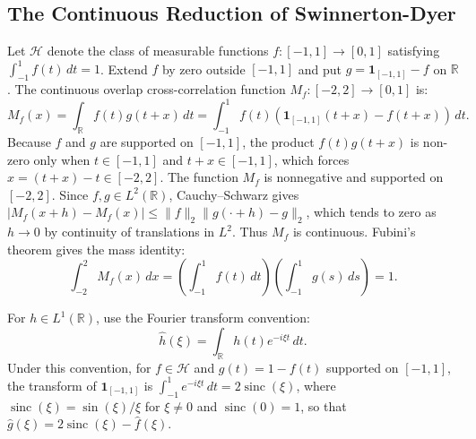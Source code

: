 \documentclass[11pt,a4paper]{article}
\theoremstyle{definition}
\theoremstyle{remark}
\newcommand{\R}{\mathbb{R}}
\begin{document}
\subsection{The Continuous Reduction of Swinnerton-Dyer}

Let $\mathcal{H}$ denote the class of measurable functions $f: [-1, 1] \to [0, 1]$ satisfying $\int_{-1}^1 f(t) \, dt = 1$. Extend $f$ by zero outside $[-1,1]$ and put $g = \mathbf{1}_{[-1,1]} - f$ on $\R$. The continuous overlap cross-correlation function $M_f: [-2, 2] \to [0, 1]$ is:
\begin{equation}
M_f(x) = \int_{\R} f(t) g(t+x) \, dt = \int_{-1}^1 f(t) \left(\mathbf{1}_{[-1, 1]}(t+x) - f(t+x)\right) \, dt.
\end{equation}
Because $f$ and $g$ are supported on $[-1, 1]$, the product $f(t)g(t+x)$ is non-zero only when $t \in [-1, 1]$ and $t+x \in [-1, 1]$, which forces $x = (t+x) - t \in [-2, 2]$. The function $M_f$ is nonnegative and supported on $[-2,2]$. Since $f,g \in L^2(\R)$, Cauchy--Schwarz gives $|M_f(x+h)-M_f(x)| \le \|f\|_2\|g(\cdot+h)-g\|_2$, which tends to zero as $h \to 0$ by continuity of translations in $L^2$. Thus $M_f$ is continuous. Fubini's theorem gives the mass identity:
\begin{equation}
\int_{-2}^2 M_f(x) \, dx = \left( \int_{-1}^1 f(t) \, dt \right) \left( \int_{-1}^1 g(s) \, ds \right) = 1.
\end{equation}

For $h \in L^1(\R)$, use the Fourier transform convention:
\begin{equation}
\widehat{h}(\xi) = \int_{\R} h(t) e^{-i\xi t} \, dt.
\end{equation}
Under this convention, for $f \in \mathcal{H}$ and $g(t) = 1 - f(t)$ supported on $[-1, 1]$, the transform of $\mathbf{1}_{[-1, 1]}$ is $\int_{-1}^1 e^{-i\xi t} \, dt = 2 \operatorname{sinc}(\xi)$, where $\operatorname{sinc}(\xi) = \sin(\xi)/\xi$ for $\xi \ne 0$ and $\operatorname{sinc}(0)=1$, so that $\widehat{g}(\xi) = 2\operatorname{sinc}(\xi) - \widehat{f}(\xi)$.
\end{document}
